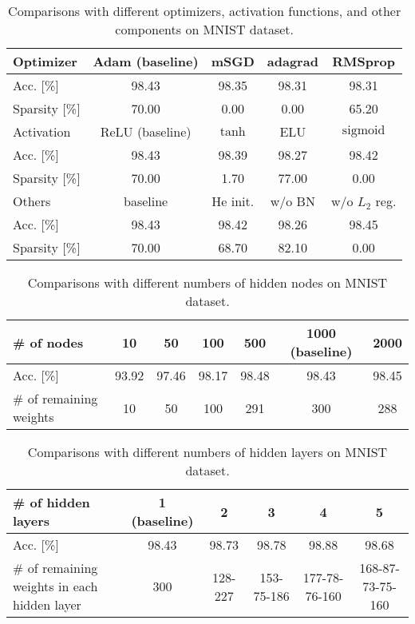 \documentclass[conference]{IEEEtran}
\begin{document}
\begin{table}[t]
\begin{center}
	\caption{Comparisons with different optimizers, activation functions, and other components on MNIST dataset.}
	\begin{tabular}{l|cccc} \hline
	Optimizer				&	Adam (baseline)	&	mSGD		&	adagrad	&	RMSprop				\\ \hline
	Acc. [\%]				&	98.43			&	98.35		&	98.31	&	98.31				\\
	Sparsity [\%]			&	70.00			&	0.00		&	0.00	&	65.20				\\ \hline
	\hline
	Activation				&	ReLU (baseline)	&	$\tanh$		&	ELU		&	$\mathrm{sigmoid}$	\\ \hline
	Acc. [\%]				&	98.43			&	98.39		&	98.27	&	98.42				\\
	Sparsity [\%]			&	70.00			&	1.70		&	77.00	&	0.00				\\ \hline
	\hline
	Others					&	baseline		&	He init.	&	w/o BN	&	w/o $L_2$ reg.		\\ \hline
	Acc. [\%]				&	98.43			&	98.42		&	98.26	&	98.45				\\
	Sparsity [\%]			&	70.00			&	68.70		&	82.10	&	0.00				\\ \hline
	\end{tabular}
	\label{tbl:opt_mnist}
\end{center}
\end{table}

\begin{table*}[t]
\begin{center}
	\caption{Comparisons with different numbers of hidden nodes on MNIST dataset.}
	\begin{tabular}{l|cccccc} \hline
	\# of nodes				&	10		&	50		&	100		&	500		&	1000 (baseline)	&	2000	\\ \hline
	Acc. [\%]				&	93.92	&	97.46	&	98.17	&	98.48	&	98.43			&	98.45	\\
	\# of remaining weights	&	10		&	50		&	100		&	291		&	300				&	288		\\ \hline
	\end{tabular}
	\label{tbl:nodes_mnist}
\end{center}
\end{table*}

\begin{table*}[t]
\begin{center}
	\caption{Comparisons with different numbers of hidden layers on MNIST dataset.}
	\begin{tabular}{l|ccccc} \hline
	\# of hidden layers								&	1 (baseline)	&	2		&	3			&	4				&	5					\\ \hline
	Acc. [\%]										&	98.43			&	98.73	&	98.78		&	98.88			&	98.68				\\
	\# of remaining weights in each hidden layer	&	300				&	128-227	&	153-75-186	&	177-78-76-160	&	168-87-73-75-160	\\ \hline
	\end{tabular}
	\label{tbl:layers_mnist}
\end{center}
\end{table*}
\end{document}
